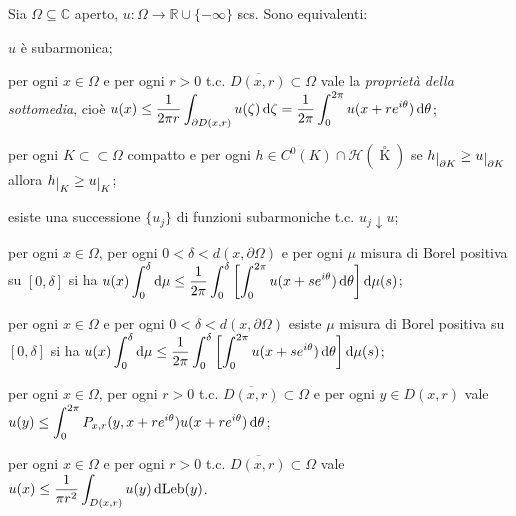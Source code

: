 \begin{thm}
  Sia $\Omega \subseteq \mathbb{C}$ aperto, $u:\Omega \longrightarrow \mathbb{R}\cup\{-\infty\}$ scs. Sono equivalenti:
  \begin{nlist}
    \item $u$ è subarmonica;
    \item per ogni $x \in \Omega$ e per ogni $r>0$ t.c. $\overline{D(x,r)} \subset \Omega$ vale la \textit{proprietà della sottomedia}, cioè $\displaystyle u(x) \le \frac{1}{2\pi r} \int_{\partial D(x,r)} u(\zeta)\mathop{}\!\mathrm{d}\zeta=\frac{1}{2\pi}\int_0^{2\pi} u(x+re^{i\theta})\mathop{}\!\mathrm{d}\theta$;
    \item per ogni $K \subset\subset \Omega$ compatto e per ogni $h \in C^0(K) \cap \mathcal{H}\left(\mathop {K}\limits^ \circ\right)$ se $h\restrict{\partial K}\ge u \restrict{\partial K}$ allora $h\restrict{K} \ge u \restrict{K}$;
    \item esiste una successione $\{u_j\}$ di funzioni subarmoniche t.c. $u_j \downarrow u$;
    \item per ogni $x \in \Omega$, per ogni $0<\delta<d(x, \partial \Omega)$ e per ogni $\mu$ misura di Borel positiva su $[0,\delta]$ si ha $\displaystyle u(x)\int_0^{\delta} \mathop{}\!\mathrm{d}\mu \le \frac{1}{2\pi}\int_0^{\delta}\left[\int_0^{2\pi} u(x+se^{i\theta})\mathop{}\!\mathrm{d}\theta\right]\mathop{}\!\mathrm{d}\mu(s)$;
    \item per ogni $x \in \Omega$ e per ogni $0<\delta<d(x, \partial \Omega)$ esiste $\mu$ misura di Borel positiva su $[0,\delta]$ si ha $\displaystyle u(x)\int_0^{\delta} \mathop{}\!\mathrm{d}\mu \le \frac{1}{2\pi}\int_0^{\delta}\left[\int_0^{2\pi} u(x+se^{i\theta})\mathop{}\!\mathrm{d}\theta\right]\mathop{}\!\mathrm{d}\mu(s)$;
    \item per ogni $x \in \Omega$, per ogni $r>0$ t.c. $\overline{D(x,r)}\subset \Omega$ e per ogni $y \in D(x,r)$ vale $\displaystyle u(y) \le \int_0^{2\pi} P_{x,r}(y,x+re^{i\theta})u(x+re^{i\theta})\mathop{}\!\mathrm{d}\theta$;
    \item per ogni $x \in \Omega$ e per ogni $r>0$ t.c. $\overline{D(x,r)}\subset \Omega$ vale $\displaystyle u(x) \le \frac{1}{\pi r^2} \int_{D(x,r)} u(y)\mathop{}\!\mathrm{d}\text{Leb}(y)$.
  \end{nlist}
\end{thm}

